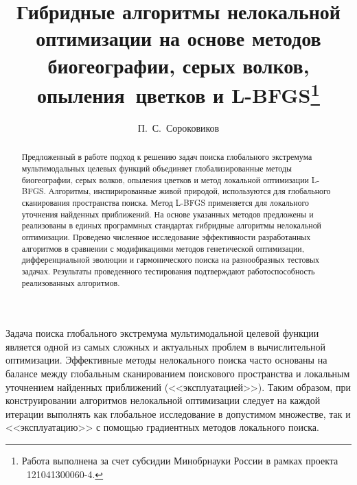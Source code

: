 \usepackage{todonotes} 

\usepackage[russian]{nla}


\fi

\title{Гибридные алгоритмы нелокальной оптимизации на основе методов биогеографии, серых волков, опыления~цветков и 
L-BFGS\thanks{Работа выполнена за счет субсидии Минобрнауки России в рамках проекта \textnumero~121041300060-4.} }
\author{П.~С.~Сороковиков  
}


\maketitle

\begin{abstract}
Предложенный в работе подход к решению задач поиска глобального экстремума мультимодальных целевых функций объединяет глобализированные методы биогеографии, серых волков, опыления цветков и метод локальной оптимизации L-BFGS. Алгоритмы, инспирированные живой природой, используются для глобального сканирования пространства поиска. Метод L-BFGS применяется для локального уточнения найденных приближений. На основе указанных методов предложены и реализованы в единых программных стандартах  гибридные алгоритмы нелокальной оптимизации. Проведено численное исследование эффективности разработанных алгоритмов в сравнении с модификациями методов генетической оптимизации, дифференциальной эволюции и гармонического поиска на разнообразных тестовых задачах. Результаты проведенного тестирования подтверждают работоспособность реализованных алгоритмов.

\end{abstract}

Задача поиска глобального экстремума мультимодальной целевой функции является одной из самых сложных и актуальных проблем в вычислительной оптимизации. Эффективные методы нелокального поиска часто основаны на балансе между глобальным сканированием поискового пространства и локальным уточнением найденных приближений (<<эксплуатацией>>). Таким образом, при конструировании алгоритмов нелокальной оптимизации следует на каждой итерации выполнять как глобальное исследование в допустимом множестве, так и <<эксплуатацию>> с помощью градиентных методов локального поиска.

